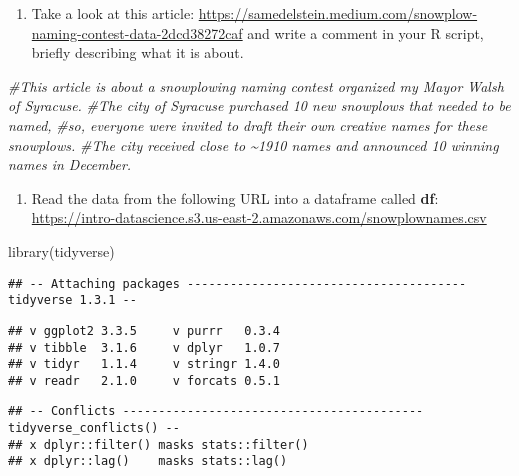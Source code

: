 \documentclass[
]{article}
\newenvironment{Shaded}{\begin{snugshade}}{\end{snugshade}}
\newcommand{\CommentTok}[1]{\textcolor[rgb]{0.56,0.35,0.01}{\textit{#1}}}
\newcommand{\FunctionTok}[1]{\textcolor[rgb]{0.00,0.00,0.00}{#1}}
\newcommand{\NormalTok}[1]{#1}
\providecommand{\tightlist}{%
  \setlength{\itemsep}{0pt}\setlength{\parskip}{0pt}}
\begin{document}
\begin{enumerate}
\def\labelenumi{\Alph{enumi}.}
\tightlist
\item
  Take a look at this article:
  \url{https://samedelstein.medium.com/snowplow-naming-contest-data-2dcd38272caf}
  and write a comment in your R script, briefly describing what it is
  about.
\end{enumerate}

\begin{Shaded}
\begin{Highlighting}[]
\CommentTok{\#This article is about a snowplowing naming contest organized my Mayor Walsh of Syracuse. }
\CommentTok{\#The city of Syracuse purchased 10 new snowplows that needed to be named,}
\CommentTok{\#so, everyone were invited to draft their own creative names for these snowplows. }
\CommentTok{\#The city received close to \textasciitilde{}1910 names and announced 10 winning names in December.}
\end{Highlighting}
\end{Shaded}

\begin{enumerate}
\def\labelenumi{\Alph{enumi}.}
\setcounter{enumi}{1}
\tightlist
\item
  Read the data from the following URL into a dataframe called
  \textbf{df}:
  \url{https://intro-datascience.s3.us-east-2.amazonaws.com/snowplownames.csv}
\end{enumerate}

\begin{Shaded}
\begin{Highlighting}[]
\FunctionTok{library}\NormalTok{(tidyverse)}
\end{Highlighting}
\end{Shaded}

\begin{verbatim}
## -- Attaching packages --------------------------------------- tidyverse 1.3.1 --
\end{verbatim}

\begin{verbatim}
## v ggplot2 3.3.5     v purrr   0.3.4
## v tibble  3.1.6     v dplyr   1.0.7
## v tidyr   1.1.4     v stringr 1.4.0
## v readr   2.1.0     v forcats 0.5.1
\end{verbatim}

\begin{verbatim}
## -- Conflicts ------------------------------------------ tidyverse_conflicts() --
## x dplyr::filter() masks stats::filter()
## x dplyr::lag()    masks stats::lag()
\end{verbatim}
\end{document}
